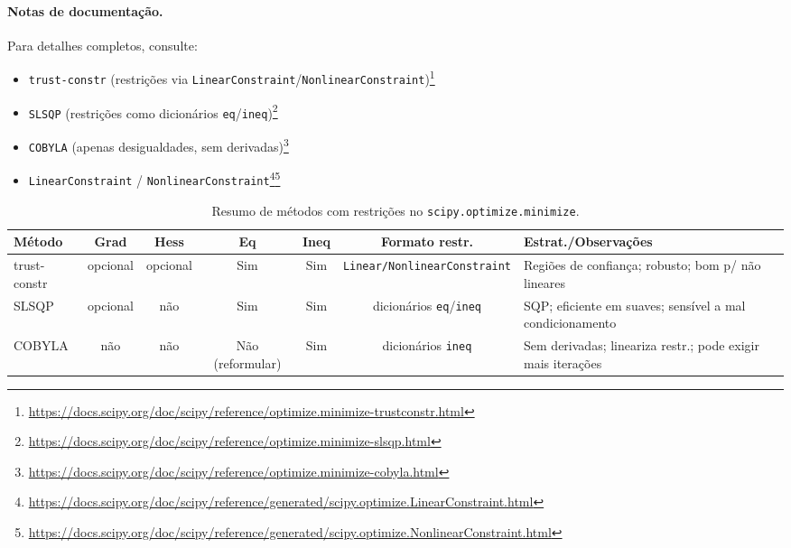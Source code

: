 \documentclass[9pt,a4paper]{extarticle}
\begin{document}
\paragraph{Notas de documenta\c c\~ao.}
Para detalhes completos, consulte:
\begin{itemize}
  \item \texttt{trust-constr} (restri\c c\~oes via \texttt{LinearConstraint}/\texttt{NonlinearConstraint})\footnote{\url{https://docs.scipy.org/doc/scipy/reference/optimize.minimize-trustconstr.html}}
  \item \texttt{SLSQP} (restri\c c\~oes como dicion\'arios \texttt{eq}/\texttt{ineq})\footnote{\url{https://docs.scipy.org/doc/scipy/reference/optimize.minimize-slsqp.html}}
  \item \texttt{COBYLA} (apenas desigualdades, sem derivadas)\footnote{\url{https://docs.scipy.org/doc/scipy/reference/optimize.minimize-cobyla.html}}
  \item \texttt{LinearConstraint} / \texttt{NonlinearConstraint}\footnote{\url{https://docs.scipy.org/doc/scipy/reference/generated/scipy.optimize.LinearConstraint.html}}\footnote{\url{https://docs.scipy.org/doc/scipy/reference/generated/scipy.optimize.NonlinearConstraint.html}}
\end{itemize}

\begin{table}[h]
\centering
\small
\setlength{\tabcolsep}{5pt}
\renewcommand{\arraystretch}{1.15}
\begin{tabular}{@{}lcccccp{4cm}@{}}
\toprule
\textbf{M\'etodo} & \textbf{Grad} & \textbf{Hess} & \textbf{Eq} & \textbf{Ineq} & \textbf{Formato restr.} & \textbf{Estrat./Observa\c c\~oes} \\
\midrule
trust-constr & opcional & opcional & Sim & Sim & \texttt{Linear/NonlinearConstraint} & Regi\~oes de confian\c ca; robusto; bom p/ n\~ao lineares \\
SLSQP        & opcional & n\~ao     & Sim & Sim & dicion\'arios \texttt{eq}/\texttt{ineq} & SQP; eficiente em suaves; sens\'ivel a mal condicionamento \\
COBYLA       & n\~ao    & n\~ao     & N\~ao (reformular) & Sim & dicion\'arios \texttt{ineq} & Sem derivadas; lineariza restr.; pode exigir mais itera\c c\~oes \\
\bottomrule
\end{tabular}
\caption{Resumo de m\'etodos com restri\c c\~oes no \texttt{scipy.optimize.minimize}.}
\end{table}
\end{document}
